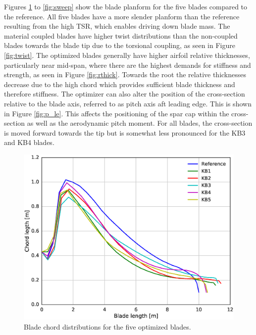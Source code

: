 Figures \ref{fig:chord} to \ref{fig:sweep} show the blade planform for the five blades compared to the reference.
All five blades have a more slender planform than the reference resulting from the high TSR, which enables driving down blade mass.
The material coupled blades have higher twist distributions than the non-coupled blades towards the blade tip due to the torsional coupling, as seen in Figure \ref{fig:twist}. 
The optimized blades generally have higher airfoil relative thicknesses, particularly near mid-span, where there are the highest demands for stiffness and strength, as seen in Figure \ref{fig:rthick}. Towards the root the relative thicknesses decrease due to the high chord which provides sufficient blade thickness and therefore stiffness.
The optimizer can also alter the position of the cross-section relative to the blade axis, referred to as pitch axis aft leading edge. This is shown in Figure \ref{fig:p_le}. This affects the positioning of the spar cap within the cross-section as well as the aerodynamic pitch moment.
For all blades, the cross-section is moved forward towards the tip but is somewhat less pronounced for the KB3 and KB4 blades. 

\begin{figure}[pht]
\begin{center}
	\includegraphics[width=.85\linewidth]{figures/KBcomp_chord.eps}
\end{center}
\caption{Blade chord distributions for the five optimized blades.}
\label{fig:chord}
\end{figure}


